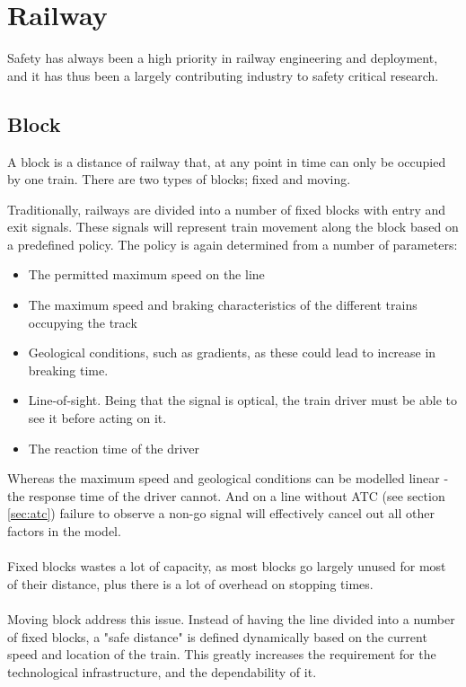 \section{Railway}
Safety has always been a high priority in railway engineering and deployment, and it has thus been a largely contributing industry to safety critical research.


\subsection{Block}
A block is a distance of railway that, at any point in time can only be occupied by one train. There are two types of blocks; fixed and moving.

Traditionally, railways are divided into a number of fixed blocks with entry and exit signals. These signals will represent train movement along the block based on a predefined policy. The policy is again determined from a number of parameters:
\begin{itemize}
  \item The permitted maximum speed on the line
  \item The maximum speed and braking characteristics of the different trains occupying the track
  \item Geological conditions, such as gradients, as these could lead to increase in breaking time.
  \item Line-of-sight. Being that the signal is optical, the train driver must be able to see it before acting on it.
  \item The reaction time of the driver
\end{itemize}
Whereas the maximum speed and geological conditions can be modelled linear - the response time of the driver cannot. And on a line without ATC (see section \ref{sec:atc}) failure to observe a non-go signal will effectively cancel out all other factors in the model.\\
\\
Fixed blocks wastes a lot of capacity, as most blocks go largely unused for most of their distance, plus there is a lot of overhead on stopping times.\\
\\
Moving block address this issue. Instead of having the line divided into a number of fixed blocks, a "safe distance" is defined dynamically based on the current speed and location of the train.
This greatly increases the requirement for the technological infrastructure, and the dependability of it.

